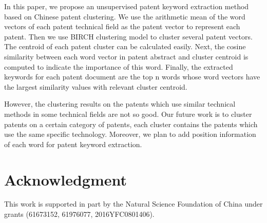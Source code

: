 \documentclass[conference]{IEEEtran}
\begin{document}
	In this paper, we propose an unsupervised patent keyword extraction method based on Chinese patent clustering. We use the arithmetic mean of the word vectors of each patent technical field as the patent vector to represent each patent. Then we use BIRCH clustering model to cluster several patent vectors. The centroid of each patent cluster can be calculated easily. Next, the cosine similarity between each word vector in patent abstract and cluster centroid is computed to indicate the importance of this word. Finally, the extracted keywords for each patent document are the top n words whose word vectors have the largest similarity values with relevant cluster centroid.
	
	However, the clustering results on the patents which use similar technical methods in some technical fields are not so good. Our future work is to cluster patents on a certain category of patents, each cluster contains the patents which use the same specific technology. Moreover, we plan to add position information of each word for patent keyword extraction.
	
	\section*{Acknowledgment}
	This work is supported in part by the Natural Science Foundation of China under grants (61673152, 61976077, 2016YFC0801406).



\end{document}
